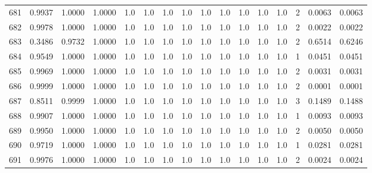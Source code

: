 \begin{tabular}{lrrrrrrrrrrrrrrr}
681 &      0.9937 &  1.0000 &  1.0000 &     1.0 &     1.0 &     1.0 &     1.0 &     1.0 &     1.0 &     1.0 &      1.0 &        1.0 &      2 &                    0.0063 &                     0.0063 \\
682 &      0.9978 &  1.0000 &  1.0000 &     1.0 &     1.0 &     1.0 &     1.0 &     1.0 &     1.0 &     1.0 &      1.0 &        1.0 &      2 &                    0.0022 &                     0.0022 \\
683 &      0.3486 &  0.9732 &  1.0000 &     1.0 &     1.0 &     1.0 &     1.0 &     1.0 &     1.0 &     1.0 &      1.0 &        1.0 &      2 &                    0.6514 &                     0.6246 \\
684 &      0.9549 &  1.0000 &  1.0000 &     1.0 &     1.0 &     1.0 &     1.0 &     1.0 &     1.0 &     1.0 &      1.0 &        1.0 &      1 &                    0.0451 &                     0.0451 \\
685 &      0.9969 &  1.0000 &  1.0000 &     1.0 &     1.0 &     1.0 &     1.0 &     1.0 &     1.0 &     1.0 &      1.0 &        1.0 &      2 &                    0.0031 &                     0.0031 \\
686 &      0.9999 &  1.0000 &  1.0000 &     1.0 &     1.0 &     1.0 &     1.0 &     1.0 &     1.0 &     1.0 &      1.0 &        1.0 &      2 &                    0.0001 &                     0.0001 \\
687 &      0.8511 &  0.9999 &  1.0000 &     1.0 &     1.0 &     1.0 &     1.0 &     1.0 &     1.0 &     1.0 &      1.0 &        1.0 &      3 &                    0.1489 &                     0.1488 \\
688 &      0.9907 &  1.0000 &  1.0000 &     1.0 &     1.0 &     1.0 &     1.0 &     1.0 &     1.0 &     1.0 &      1.0 &        1.0 &      1 &                    0.0093 &                     0.0093 \\
689 &      0.9950 &  1.0000 &  1.0000 &     1.0 &     1.0 &     1.0 &     1.0 &     1.0 &     1.0 &     1.0 &      1.0 &        1.0 &      2 &                    0.0050 &                     0.0050 \\
690 &      0.9719 &  1.0000 &  1.0000 &     1.0 &     1.0 &     1.0 &     1.0 &     1.0 &     1.0 &     1.0 &      1.0 &        1.0 &      1 &                    0.0281 &                     0.0281 \\
691 &      0.9976 &  1.0000 &  1.0000 &     1.0 &     1.0 &     1.0 &     1.0 &     1.0 &     1.0 &     1.0 &      1.0 &        1.0 &      2 &                    0.0024 &                     0.0024 \\

\end{tabular}
